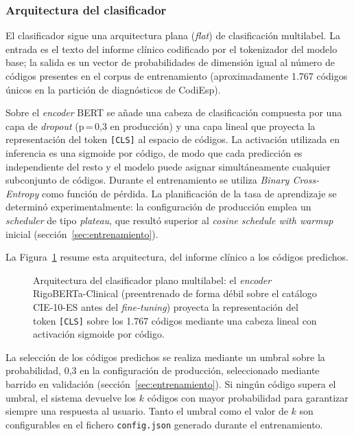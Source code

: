 \subsubsection{Arquitectura del clasificador}

El clasificador sigue una arquitectura plana (\emph{flat}) de clasificación multilabel. La entrada es el texto del informe clínico codificado por el tokenizador del modelo base; la salida es un vector de probabilidades de dimensión igual al número de códigos presentes en el corpus de entrenamiento (aproximadamente 1.767 códigos únicos en la partición de diagnósticos de CodiEsp).

Sobre el \emph{encoder} BERT se añade una cabeza de clasificación compuesta por una capa de \emph{dropout} (p\,=\,0,3 en producción) y una capa lineal que proyecta la representación del token \texttt{[CLS]} al espacio de códigos. La activación utilizada en inferencia es una sigmoide por código, de modo que cada predicción es independiente del resto y el modelo puede asignar simultáneamente cualquier subconjunto de códigos. Durante el entrenamiento se utiliza \emph{Binary Cross-Entropy} como función de pérdida. La planificación de la tasa de aprendizaje se determinó experimentalmente: la configuración de producción emplea un \emph{scheduler} de tipo \emph{plateau}, que resultó superior al \emph{cosine schedule with warmup} inicial (sección~\ref{sec:entrenamiento}).

La Figura~\ref{fig:arq-clasificador} resume esta arquitectura, del informe clínico a los códigos predichos.

\begin{figure}[ht]
\centering
\resizebox{\textwidth}{!}{}
\caption{Arquitectura del clasificador plano multilabel: el \emph{encoder} RigoBERTa-Clinical (preentrenado de forma débil sobre el catálogo CIE-10-ES antes del \emph{fine-tuning}) proyecta la representación del token \texttt{[CLS]} sobre los 1.767 códigos mediante una cabeza lineal con activación sigmoide por código.}
\label{fig:arq-clasificador}
\end{figure}

La selección de los códigos predichos se realiza mediante un umbral sobre la probabilidad, 0,3 en la configuración de producción, seleccionado mediante barrido en validación (sección~\ref{sec:entrenamiento}). Si ningún código supera el umbral, el sistema devuelve los \(k\) códigos con mayor probabilidad para garantizar siempre una respuesta al usuario. Tanto el umbral como el valor de \(k\) son configurables en el fichero \texttt{config.json} generado durante el entrenamiento.

